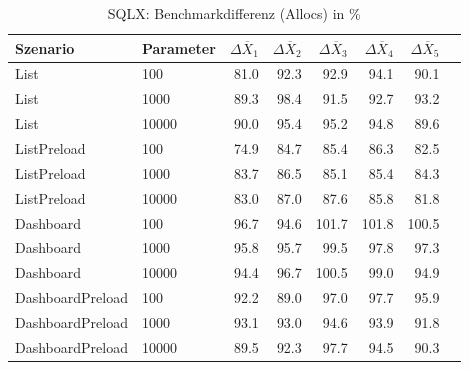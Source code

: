 
\begin{table}[ht]
\setlength{\extrarowheight}{-1pt}
\centering
\caption{SQLX: Benchmarkdifferenz (Allocs) in \%}
\begin{tabular}{llrrrrrr}
\toprule
Szenario & Parameter & ${\Delta \overline{X}_1}$ & ${\Delta \overline{X}_2}$ & ${\Delta \overline{X}_3}$ & ${\Delta \overline{X}_4}$ & ${\Delta \overline{X}_5}$ \\
\midrule
	List & 100 & \cellcolor{green!18}  81.0 & \cellcolor{green!13}  92.3 & \cellcolor{green!13}  92.9 & \cellcolor{green!12}  94.1 & \cellcolor{green!14}  90.1 \\
	List & 1000 & \cellcolor{green!14}  89.3 &  98.4 & \cellcolor{green!13}  91.5 & \cellcolor{green!13}  92.7 & \cellcolor{green!13}  93.2 \\
	List & 10000 & \cellcolor{green!14}  90.0 & \cellcolor{green!12}  95.4 & \cellcolor{green!12}  95.2 & \cellcolor{green!12}  94.8 & \cellcolor{green!14}  89.6 \\
	ListPreload & 100 & \cellcolor{green!20}  74.9 & \cellcolor{green!16}  84.7 & \cellcolor{green!16}  85.4 & \cellcolor{green!15}  86.3 & \cellcolor{green!17}  82.5 \\
	ListPreload & 1000 & \cellcolor{green!17}  83.7 & \cellcolor{green!15}  86.5 & \cellcolor{green!16}  85.1 & \cellcolor{green!16}  85.4 & \cellcolor{green!16}  84.3 \\
	ListPreload & 10000 & \cellcolor{green!17}  83.0 & \cellcolor{green!15}  87.0 & \cellcolor{green!15}  87.6 & \cellcolor{green!16}  85.8 & \cellcolor{green!17}  81.8 \\
	Dashboard & 100 & \cellcolor{green!11}  96.7 & \cellcolor{green!12}  94.6 &  101.7 &  101.8 &  100.5 \\
	Dashboard & 1000 & \cellcolor{green!12}  95.8 & \cellcolor{green!12}  95.7 &  99.5 & \cellcolor{green!11}  97.8 & \cellcolor{green!11}  97.3 \\
	Dashboard & 10000 & \cellcolor{green!12}  94.4 & \cellcolor{green!11}  96.7 &  100.5 &  99.0 & \cellcolor{green!12}  94.9 \\
	DashboardPreload & 100 & \cellcolor{green!13}  92.2 & \cellcolor{green!14}  89.0 & \cellcolor{green!11}  97.0 & \cellcolor{green!11}  97.7 & \cellcolor{green!12}  95.9 \\
	DashboardPreload & 1000 & \cellcolor{green!13}  93.1 & \cellcolor{green!13}  93.0 & \cellcolor{green!12}  94.6 & \cellcolor{green!12}  93.9 & \cellcolor{green!13}  91.8 \\
	DashboardPreload & 10000 & \cellcolor{green!14}  89.5 & \cellcolor{green!13}  92.3 & \cellcolor{green!11}  97.7 & \cellcolor{green!12}  94.5 & \cellcolor{green!14}  90.3 \\
\bottomrule
\end{tabular}
\label{tab:benchmarkdifferenz_sqlx_allocs}
\end{table}
	